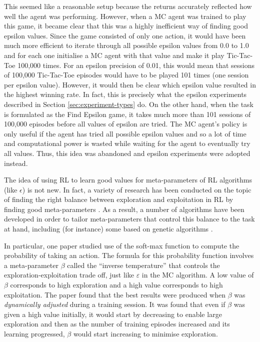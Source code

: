 \documentclass[11pt,a4paper]{report}
\begin{document}
This seemed like a reasonable setup because the returns accurately reflected how well the agent was performing. However, when a MC agent was trained to play this game, it became clear that this was a highly inefficient way of finding good epsilon values. Since the game consisted of only one action, it would have been much more efficient to iterate through all possible epsilon values from 0.0 to 1.0 and for each one initialise a MC agent with that value and make it play Tic-Tac-Toe 100,000 times. For an epsilon precision of 0.01, this would mean that sessions of 100,000 Tic-Tac-Toe episodes would have to be played 101 times (one session per epsilon value). However, it would then be clear which epsilon value resulted in the highest winning rate. In fact, this is precisely what the epsilon experiments described in Section \ref{sec:experiment-types} do. On the other hand, when the task is formulated as the Find Epsilon game, it takes much more than 101 sessions of 100,000 episodes before all values of epsilon are tried. The MC agent's policy is only useful if the agent has tried all possible epsilon values and so a lot of time and computational power is wasted while waiting for the agent to eventually try all values. Thus, this idea was abandoned and epsilon experiments were adopted instead.

The idea of using RL to learn good values for meta-parameters of RL algorithms (like $\epsilon$) is not new. In fact, a variety of research has been conducted on the topic of finding the right balance between exploration and exploitation in RL by finding good meta-parameters \cite{meta-optimization} \cite{meta-param-evolution} \cite{exploration-exploitation-meta-param} \cite{meta-learning-rl}. As a result, a number of algorithms have been developed in order to tailor meta-parameters that control this balance to the task at hand, including (for instance) some based on genetic algorithms \cite{meta-param-evolution}.

In particular, one paper \cite{meta-learning-rl} studied use of the soft-max function to compute the probability of taking an action. The formula for this probability function involves a meta-parameter $\beta$ called the ``inverse temperature'' that controls the exploration-exploitation trade off, just like $\varepsilon$ in the MC algorithm. A low value of $\beta$ corresponds to high exploration and a high value corresponds to high exploitation. The paper found that the best results were produced when $\beta$ was \emph{dynamically adjusted} during a training session. It was found that even if $\beta$ was given a high value initially, it would start by decreasing to enable large exploration and then as the number of training episodes increased and its learning progressed, $\beta$ would start increasing to minimise exploration.
\end{document}
